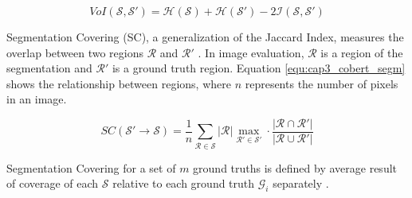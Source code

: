 \begin{equation}
 VoI\mathcal{(S, S') = H(S) + H(S')} − 2 \mathcal{I(S, S')}
 \label{equ:cap3_voi}
\end{equation}

Segmentation Covering (\ac{SC}), a generalization of the Jaccard Index, measures the overlap between two regions $\mathcal{R}$ and $\mathcal{R'}$ \cite{Milena:2019} \cite{Pont-Tuset2016a}.
In image evaluation, $\mathcal{R}$ is a region of the segmentation and $\mathcal{R'}$ is a ground truth region.
Equation \ref{equ:cap3_cobert_segm} shows the relationship between regions, where $n$ represents the number of pixels in an image.

\begin{equation}
 SC\mathcal{(S' \rightarrow S)} = \frac{1}{n} \sum\limits_{\mathcal{R} \in \mathcal{S}} {|\mathcal{R}|} \max\limits_{\mathcal{R'} \in \mathcal{S'}} \cdot \frac{|\mathcal{R} \cap \mathcal{R'}|}{|\mathcal{R} \cup \mathcal{R'}|}
 \label{equ:cap3_cobert_segm}
\end{equation}

Segmentation Covering for a set of $m$ ground truths is defined by average result of coverage of each $\mathcal{S}$ relative to each ground truth $\mathcal{G}_i$ separately \cite{Milena:2019}.

